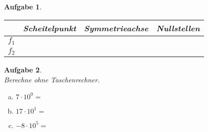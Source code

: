 \documentclass[12pt,fleqn]{article}
\theoremstyle{aufg}
\newtheorem{aufgabe}{Aufgabe}
\theoremstyle{bsp}
\begin{document}
\begin{flushleft}
\begin{aufgabe}
\begin{minipage}{0.25\textwidth}
\end{minipage} 
\begin{minipage}{0.1\textwidth} 
 ~ \end{minipage} 
\begin{minipage}{0.55\textwidth} 
\renewcommand{\arraystretch}{1.5} 
\begin{tabular}{c|c|c|c}
 & Scheitelpunkt & Symmetrieachse & Nullstellen\\ \hline 
$f_1$ &  &  & \\ \hline 
$f_2$ &  &  & \\ 

\end{tabular} 

\end{minipage} 

\end{aufgabe} 
\begin{aufgabe} ~ \\ 
Berechne ohne Taschenrechner. \\ 
\begin{multicols}{3} 
\begin{enumerate}[a)] 
\item 
$7\cdot10^{0}=$
\item 
$17\cdot10^{1}=$
\item 
$-8\cdot10^{5}=$
\end{enumerate} 
\end{multicols} 
\end{aufgabe} 


\end{flushleft}
\end{document}

